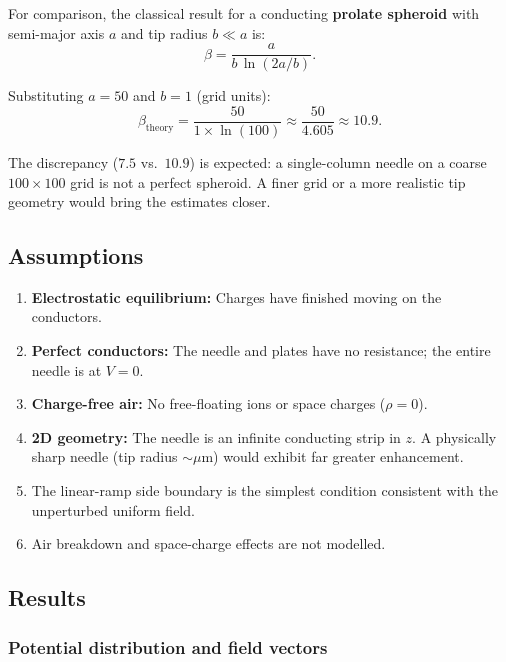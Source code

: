 \documentclass[11pt,a4paper]{article}
\begin{document}
For comparison, the classical result for a conducting \textbf{prolate spheroid} with semi-major axis $a$ and tip radius $b \ll a$ is:
\begin{equation}
\boxed{\;\beta = \frac{a}{b\,\ln(2a/b)}.\;}
\label{eq:beta_theory}
\end{equation}

Substituting $a = 50$ and $b = 1$ (grid units):
\begin{equation}
\beta_{\text{theory}} = \frac{50}{1 \times \ln(100)} \approx \frac{50}{4.605} \approx 10.9.
\end{equation}

The discrepancy ($7.5$ vs.\ $10.9$) is expected: a single-column needle on a coarse $100 \times 100$ grid is not a perfect spheroid. A finer grid or a more realistic tip geometry would bring the estimates closer.

\subsection{Assumptions}
\begin{enumerate}[leftmargin=2em]
\item \textbf{Electrostatic equilibrium:} Charges have finished moving on the conductors.
\item \textbf{Perfect conductors:} The needle and plates have no resistance; the entire needle is at $V=0$.
\item \textbf{Charge-free air:} No free-floating ions or space charges ($\rho = 0$).
\item \textbf{2D geometry:} The needle is an infinite conducting strip in $z$. A physically sharp needle (tip radius ${\sim}\mu$m) would exhibit far greater enhancement.
\item The linear-ramp side boundary is the simplest condition consistent with the unperturbed uniform field.
\item Air breakdown and space-charge effects are not modelled.
\end{enumerate}

\subsection{Results}

\subsubsection{Potential distribution and field vectors}
\end{document}
